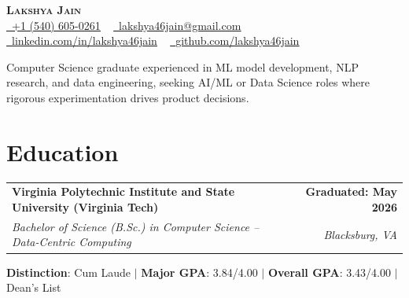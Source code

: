 \documentclass[letterpaper,11pt]{article}
\makeatletter
\newcommand{\resumeEducationSubheading}[4]{
  \vspace{-2pt}\item
    \begin{tabular*}{1.0\textwidth}[t]{l@{\extracolsep{\fill}}r}
      \textbf{#1} & \textbf{\small #2} \\
      \textit{\small#3} & \textit{\small #4} \\
    \end{tabular*}\vspace{-7pt}
}
\newcommand{\resumeSubHeadingListStart}{\begin{itemize}[leftmargin=0.0in, label={}]}
\newcommand{\resumeSubHeadingListEnd}{\end{itemize}}
\makeatother
\begin{document}
\begin{center}
    \textbf{\Huge \scshape Lakshya Jain} \\ \vspace{7.5pt}
    \small{
        \href{tel:1-540-605-0261}{\faPhone\ \underline{+1 (540) 605-0261}} ~
        \href{mailto:lakshya46jain@gmail.com}{\faEnvelope\ \underline{lakshya46jain@gmail.com}} ~
        \href{https://linkedin.com/in/lakshya46jain}{\faLinkedin\ \underline{linkedin.com/in/lakshya46jain}} ~
        \href{https://github.com/lakshya46jain}{\faGithub\ \underline{github.com/lakshya46jain}}
        }
    \vspace{-2.5pt}
\end{center}

\vspace{-4pt}
\begin{center}
    \small{Computer Science graduate experienced in ML model development, NLP research, and data engineering, seeking AI/ML or Data Science roles where rigorous experimentation drives product decisions.}
\end{center}

\section{Education}
    \resumeSubHeadingListStart
        \resumeEducationSubheading
            {Virginia Polytechnic Institute and State University (Virginia Tech)}
            {Graduated: May 2026}
            {Bachelor of Science (B.Sc.) in Computer Science -- Data-Centric Computing}
            {Blacksburg, VA}
            \small{\item[]{\textbf{Distinction}{: Cum Laude} $|$ \textbf{Major GPA}{: 3.84/4.00} $|$ \textbf{Overall GPA}{: 3.43/4.00} $|$ Dean's List}}
    \resumeSubHeadingListEnd
\end{document}
